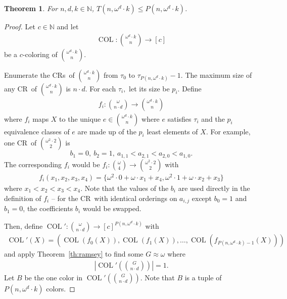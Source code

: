 \documentclass[10pt,a4paper]{article}
\newcommand{\om}{\omega}
\newcommand{\oequiv}{\approx}
\newcommand{\COL}{\operatorname{COL}}
\newcommand{\N}{\mathbb{N}}
\newcommand{\crulenospace}{CR}
\newcommand{\crule}{\crulenospace~}
\newcommand{\crules}{\crulenospace s~}
\newcommand{\numpoints}{n}
\newcommand{\inumpoints}{i}
\newcommand{\idegr}{j}
\newcommand{\numcolors}{c}
\newcommand{\commonconst}{a}
\newcommand{\rareconst}{b}
\newcommand{\Rareconst}{B}
\theoremstyle{plain}
\newtheorem{theorem}{Theorem}[section]
\theoremstyle{definition}
\begin{document}
\begin{theorem}\label{th:wdk-LT}
For $\numpoints,d,k \in \N$, $T\left(\numpoints, \om^d \cdot k\right) \leq P\left(\numpoints, \om^d \cdot k\right)$.
\end{theorem} 

\begin{proof}
Let $\numcolors \in \N$ and let \begin{align*}
    \COL \colon \binom{\om^d\cdot k}{\numpoints} \to [\numcolors]
\end{align*}
be a $\numcolors$-coloring of $\binom{\om^d\cdot k}{\numpoints}$.

Enumerate the \crules of $\binom{\om^d\cdot k}{\numpoints}$ from $\tau_0$ to $\tau_{P(\numpoints, \om^d \cdot k)}-1$. The maximum size of any \crule of $\binom{\om^d\cdot k}{\numpoints}$ is $\numpoints \cdot d$. For each $\tau_i,$ let its size be $p_i$. Define \begin{align*}
    f_i \colon \binom{\om}{\numpoints \cdot d} \to \binom{\om^d\cdot k}{\numpoints}
\end{align*}
where $f_i$ maps $X$ to the unique $e \in \binom{\om^d\cdot k}{\numpoints}$
where $e$ satisfies $\tau_i$ and the $p_i$ equivalence classes of $e$ are made up of the $p_i$ least elements of $X$. For example, one \crule of $\binom{\om^2\cdot 2}{2}$ is $$
\rareconst_1=0,~\rareconst_2=1,~\commonconst_{1, 1} < \commonconst_{2, 1} < \commonconst_{2, 0} < \commonconst_{1, 0}.
$$ The corresponding $f_i$ would be $f_i \colon \binom{\om}{4} \to \binom{\om^2\cdot 2}{2}$ with \begin{align*}
f_i(x_1,x_2,x_3,x_4) = \{\om^2 \cdot 0 + \om \cdot x_1 + x_4, \om^2 \cdot 1 + \om \cdot x_2 + x_3\}
\end{align*} where $x_1 < x_2 < x_3 < x_4$. Note that the values of the $\rareconst_{\inumpoints}$ are used directly in the definition of $f_i$ -- for the \crule with identical orderings on $\commonconst_{\inumpoints,\idegr}$ except $\rareconst_0=1$ and $\rareconst_1=0$, the coefficients $\rareconst_{\inumpoints}$ would be swapped.

Then, define $\COL' \colon \binom{\om}{\numpoints \cdot d} \to [\numcolors]^{P(\numpoints,\om^d \cdot k)}$ with \begin{align*}
    \COL'(X) = (\COL(f_0(X)),\COL(f_1(X)),\ldots,\COL(f_{P(\numpoints, \om^d \cdot k)-1}(X)))
\end{align*}
and apply Theorem~\ref{th:ramsey} to find some $G \oequiv \om$ where \begin{align*}
\left |    \COL' \left( \binom{G}{\numpoints \cdot d} \right)\right |=1.
\end{align*}
Let $\Rareconst$ be the one color in $\COL'\left(\binom{G}{\numpoints\cdot d}\right)$.
Note that $\Rareconst$ is a tuple of $P(\numpoints, \om^d \cdot k)$ colors.


\end{proof}
\end{document}
